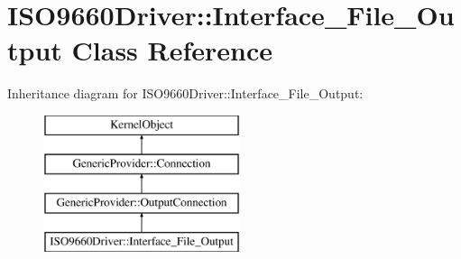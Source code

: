 \hypertarget{class_i_s_o9660_driver_1_1_interface___file___output}{}\section{I\+S\+O9660\+Driver\+:\+:Interface\+\_\+\+File\+\_\+\+Output Class Reference}
\label{class_i_s_o9660_driver_1_1_interface___file___output}
Inheritance diagram for I\+S\+O9660\+Driver\+:\+:Interface\+\_\+\+File\+\_\+\+Output\+:\begin{figure}[H]
\begin{center}
\leavevmode
\includegraphics[height=4.000000cm]{class_i_s_o9660_driver_1_1_interface___file___output}
\end{center}
\end{figure}

